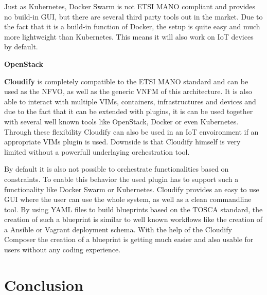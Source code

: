 Just as Kubernetes, Docker Swarm is not \ac{ETSI} \ac{MANO} compliant and provides no build-in \ac{GUI}, but there are several third party tools out in the market.
Due to the fact that it is a build-in function of Docker, the setup is quite easy and much more lightweight than Kubernetes.
This means it will also work on \ac{IoT} devices by default.

\textbf{OpenStack}

\textbf{Cloudify} is completely compatible to the \ac{ETSI} \ac{MANO} standard and can be used as the \ac{NFVO}, as well as the generic \ac{VNFM} of this architecture.\cite[cf.]{Cloudify:MANO}
It is also able to interact with multiple \acp{VIM}, containers, infrastructures and devices and due to the fact that it can be extended with plugins, it is can be used together with several well known tools like OpenStack, Docker or even Kubernetes.\cite[cf.]{Cloudify:MANO}
Through these flexibility Cloudify can also be used in an \ac{IoT} envoironment if an appropriate \acp{VIM} plugin is used.
Downside is that Cloudify himself is very limited without a powerfull underlaying orchestration tool.

By default it is also not possible to orchestrate functionalities based on constraints.
To enable this behavior the used plugin has to support such a functionality like Docker Swarm or Kubernetes.
Cloudify provides an easy to use \ac{GUI} where the user can use the whole system, as well as a clean commandline tool.
By using \ac{YAML} files to build blueprints based on the \ac{TOSCA} standard, the creation of such a blueprint is similar to well known workflows like the creation of a Ansible or Vagrant deployment schema.
With the help of the Cloudify Composer the creation of a blueprint is getting much easier and also usable for users without any coding experience.



\section{Conclusion}
\doit
